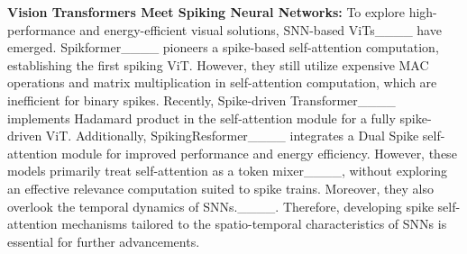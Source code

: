 \textbf{Vision Transformers Meet Spiking Neural Networks:} To explore high-performance and energy-efficient visual solutions, SNN-based ViTs____ have emerged.
Spikformer____ pioneers a spike-based self-attention computation, establishing the first spiking ViT. 
However, they still utilize expensive MAC operations and matrix multiplication in self-attention computation, which are inefficient for binary spikes. 
Recently, Spike-driven Transformer____ implements Hadamard product in the self-attention module for a fully spike-driven ViT. Additionally,  SpikingResformer____ integrates a Dual Spike self-attention module for improved performance and energy efficiency. However, these models primarily treat self-attention as a token mixer____, without exploring an effective relevance computation suited to spike trains. Moreover, they also overlook the temporal dynamics of SNNs.____. Therefore, developing spike self-attention mechanisms tailored to the spatio-temporal characteristics of SNNs is essential for further advancements.